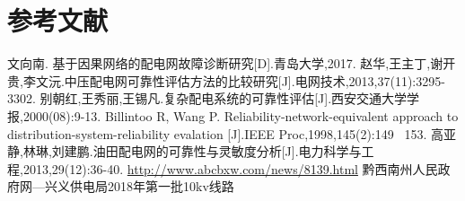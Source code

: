 \documentclass[withoutpreface,bwprint]{cumcmthesis} %
\begin{document}
\section{参考文献}
\begin{thebibliography}{9}%
    文向南. 基于因果网络的配电网故障诊断研究[D].青岛大学,2017.
    赵华,王主丁,谢开贵,李文沅.中压配电网可靠性评估方法的比较研究[J].电网技术,2013,37(11):3295-3302.
    别朝红,王秀丽,王锡凡.复杂配电系统的可靠性评估[J].西安交通大学学报,2000(08):9-13.
    Billintoo R, Wang P. Reliability-network-equivalent approach to distribution-system-reliability evalation [J].IEEE
    Proc,1998,145(2):149~ 153.
    高亚静,林琳,刘建鹏.油田配电网的可靠性与灵敏度分析[J].电力科学与工程,2013,29(12):36-40.
    \url{http://www.abcbxw.com/news/8139.html} 黔西南州人民政府网—兴义供电局2018年第一批10kv线路
\end{thebibliography}
\end{document}
